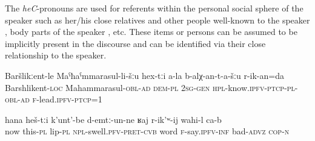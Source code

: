 The \textit{heC}-pronouns are used for referents within the personal social sphere of the speaker such as her/his close relatives and other people well-known to the speaker , body parts of the speaker , etc. These items or persons can be assumed to be implicitly present in the discourse and can be identified via their close relationship to the speaker.
%
\begin{exe}
	\ex	\label{To Bashlikent, to MR, to the ones that you know we will bring you}
	\gll 	Baršlikːent-le	Maˁħaˁmmarasul-li-šːu	hex-tːi	a-la	b-alχ-an-t-a-šːu	r-ik-an=da \\
		Barshlikent-\textsc{loc}	Mahammarasul-\textsc{obl-ad}	\textsc{dem-pl}	\textsc{2sg-gen}	\textsc{hpl}-know.\textsc{ipfv}-\textsc{ptcp}-\textsc{pl}-\textsc{obl-ad} \textsc{f}-lead.\textsc{ipfv}-\textsc{ptcp}=1\\
	\glt	{}

	\ex	\label{Now the (i.e. my) lips are swollen, it is difficult to talk}
	\gll	hana	heš-tːi	k'unt'-be	d-emtː-un-ne		ʁaj	r-ik'ʷ-ij	wahi-l	ca-b \\
now	this-\textsc{pl}	lip-\textsc{pl}	\textsc{npl}-swell.\textsc{pfv}-\textsc{pret}-\textsc{cvb}	word	\textsc{f}-say.\textsc{ipfv}-\textsc{inf}	bad-\textsc{advz}	\textsc{cop-n}\\
	\glt	{}
\end{exe}

